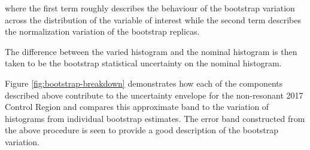 where the first term roughly describes the behaviour of the bootstrap variation across the distribution of 
the variable of interest while the second term describes the normalization variation of the bootstrap replicas.

The difference between the varied histogram and the nominal histogram is then
taken to be the bootstrap statistical uncertainty on the nominal histogram.

Figure \ref{fig:bootstrap-breakdown} demonstrates how each of the components described above
contribute to the uncertainty envelope for the non-resonant 2017 Control Region 
and compares this approximate band to the variation of histograms from individual bootstrap 
estimates. The error band constructed from the above procedure is seen to provide a good 
description of the bootstrap variation.

